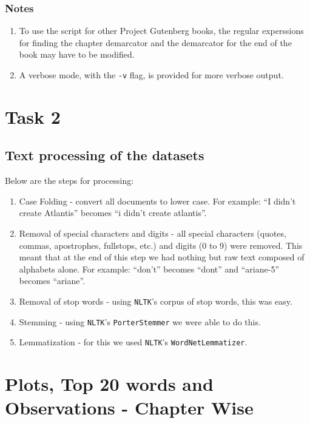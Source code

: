 \documentclass{article}
\begin{document}
\begin{flushleft}
\subsubsection*{Notes}
\begin{enumerate}
	\item To use the script for other Project Gutenberg books, the regular experssions for finding the chapter demarcator and the demarcator for the end of the book may have to be modified.
	\item A verbose mode, with the \verb|-v| flag, is provided for more verbose output.
\end{enumerate}
\end{flushleft}
\newpage

\section{Task 2}
\subsection{Text processing of the datasets}
\begin{flushleft}
	Below are the steps for processing:
	\begin{enumerate}
        \item Case Folding - convert all documents to lower case. For example: ``I didn't create Atlantis'' becomes ``i didn't create atlantis''.
        \item Removal of special characters and digits - all special characters (quotes, commas, apostrophes, fullstops, etc.) and digits (0 to 9) were removed. This meant that at the end of this step we had nothing but raw text composed of alphabets alone. For example: ``don't'' becomes ``dont'' and ``ariane-5'' becomes ``ariane''.
		\item Removal of stop words - using \texttt{NLTK}'s corpus of stop words, this was easy.
		\item Stemming - using \texttt{NLTK}'s \texttt{PorterStemmer} we were able to do this.
		\item Lemmatization - for this we used \texttt{NLTK}'s \texttt{WordNetLemmatizer}.
	\end{enumerate}
\end{flushleft}

\section{Plots, Top 20 words and Observations - Chapter Wise}
\end{document}
